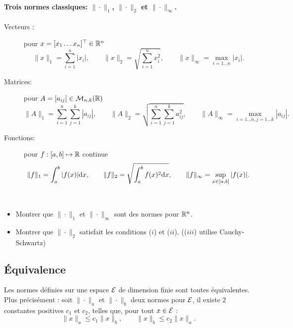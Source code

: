 \paragraph{Trois normes classiques: $\|\cdot\|_1$, $\|\cdot\|_2$ et $\|\cdot\|_\infty$.}
\begin{description}
 \item[Vecteurs :] pour $x = [x_1 \dots x_n]^\top \in \mathbb{R}^n$
 $$
 \|x\|_1 = \sum_{i=1}^n |x_i|, \qquad 
 \|x\|_2 = \sqrt{\sum_{i=1}^n x_i^2}, \qquad 
 \|x\|_\infty = \max_{i = 1 \dots n} |x_i|. 
 $$
 \item[Matrices:] pour $A = [a_{ij}] \in \mathcal{M}_{n, k}(\mathbb{R})$
 $$
 \|A\|_1 = \sum_{i=1}^n \sum_{j=1}^k |a_{ij}|, \qquad 
 \|A\|_2 = \sqrt{\sum_{i=1}^n \sum_{j=1}^k a_{ij}^2}, \qquad 
 \|A\|_\infty = \max_{i = 1 \dots n, j = 1 \dots k} |a_{ij}|. 
 $$
 \item[Fonctions:] pour $f : [a, b] \mapsto \mathbb{R}$ continue
 $$
 \|f\|_1 = \int_a^b |f(x)| \text{d} x, \qquad 
 \|f\|_2 = \sqrt{\int_a^b f(x)^2 \text{d} x}, \qquad 
 \|f\|_\infty = \sup_{x \in [a, b]} |f(x)|.
 $$
\end{description}


\begin{exercise*} ~ 
  \begin{itemize}
   \item Montrer que $\|\cdot\|_1$ et $\|\cdot\|_\infty$ sont des normes pour $\mathbb{R}^n$.
   \item Montrer que $\|\cdot\|_2$ satisfait les conditions ($i$) et ($ii$). (($iii$) utilise Cauchy-Schwartz)
  \end{itemize}
\end{exercise*}

\subsection{\'Equivalence} 

\begin{theorem*}[Théorème 2.1.5]
  Les normes définies sur une espace $\mathcal{E}$ de dimension finie sont toutes équivalentes. Plus précisément : soit $\|\cdot\|_a$ et $\|\cdot\|_b$ deux normes pour $\mathcal{E}$, il existe 2 constantes positives $c_1$ et $c_2$, telles que, pour tout $x \in \mathcal{E}$ :
  $$
  \|x\|_a \leq c_1 \|x\|_b, \qquad
  \|x\|_b \leq c_2 \|x\|_a.
  $$
\end{theorem*}

